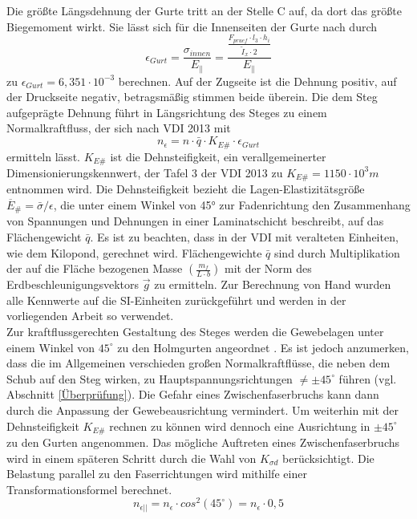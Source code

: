 \noindent Die größte Längsdehnung der Gurte tritt an der Stelle C auf, da dort das größte Biegemoment wirkt. Sie lässt sich für die Innenseiten der Gurte nach \cite{item16} durch
\begin{equation}
	\epsilon_{Gurt}=\frac{\sigma_{innen}}{E_{\|}}=\frac{\frac{F_{pruef}\cdot l_{3}\cdot h_{i}}{\tilde{I}_{x}\cdot 2}}{E_{\|}}
\end{equation}  
 zu $ \epsilon_{Gurt}=6,351\cdot 10^{-3} $ berechnen. Auf der Zugseite ist die Dehnung positiv, auf der Druckseite negativ, betragsmäßig stimmen beide überein. Die dem Steg aufgeprägte Dehnung führt in Längsrichtung des Steges zu einem Normalkraftfluss, der sich nach VDI 2013 mit
 \begin{equation}\label{ne}
 	n_{\epsilon}=n\cdot \bar{q}\cdot K_{E\#}\cdot \epsilon_{Gurt}
 \end{equation} 
ermitteln lässt. $ K_{E\#} $ ist die Dehnsteifigkeit, ein verallgemeinerter Dimensionierungskennwert, der Tafel 3 der VDI 2013 zu $ K_{E\#}=1150\cdot 10^{3}m $ entnommen wird. Die Dehnsteifigkeit bezieht die Lagen-Elastizitätsgröße $ \overline{E}_{\#}=\bar{\sigma}/ \epsilon $, die unter einem Winkel von 45° zur Fadenrichtung den Zusammenhang von Spannungen und Dehnungen in einer Laminatschicht beschreibt, auf das Flächengewicht $ \bar{q} $.
Es ist zu beachten, dass in der VDI mit veralteten Einheiten, wie dem Kilopond, gerechnet wird. Flächengewichte $ \bar{q} $ sind durch Multiplikation der auf die Fläche bezogenen Masse $ \left(\frac{m_{f}}{L\cdot b}\right) $ mit der Norm des Erdbeschleunigungsvektors $ \vec{g} $ zu ermitteln. Zur Berechnung von Hand wurden alle Kennwerte auf die SI-Einheiten zurückgeführt und werden in der vorliegenden Arbeit so verwendet.\\

\noindent Zur kraftflussgerechten Gestaltung des Steges werden die Gewebelagen unter einem Winkel von $ 45^{\circ} $ zu den Holmgurten angeordnet \cite{item5}. Es ist jedoch anzumerken, dass die im Allgemeinen verschieden großen Normalkraftflüsse, die neben dem Schub auf den Steg wirken, zu Hauptspannungsrichtungen $ \neq \pm 45^{\circ} $ führen (vgl. Abschnitt \ref{Überprüfung}). Die Gefahr eines Zwischenfaserbruchs kann dann durch die Anpassung der Gewebeausrichtung vermindert. Um weiterhin mit der Dehnsteifigkeit $ K_{E\#} $ rechnen zu können wird dennoch eine Ausrichtung in $ \pm 45^{\circ} $ zu den Gurten angenommen. Das mögliche Auftreten eines Zwischenfaserbruchs wird in einem späteren Schritt durch die Wahl von $ K_{\sigma d} $ berücksichtigt.  
Die Belastung parallel zu den Faserrichtungen wird mithilfe einer Transformationsformel berechnet.
\begin{equation}
	n_{\epsilon||}=n_{\epsilon}\cdot cos^{2}\left(45^{\circ} \right)=n_{\epsilon}\cdot 0,5 
\end{equation}

